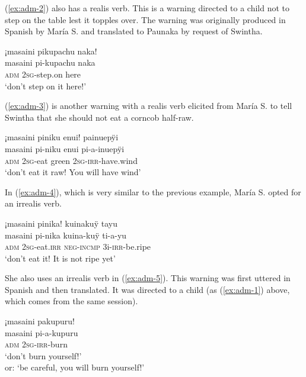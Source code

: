 (\ref{ex:adm-2}) also has a realis verb. This is a warning directed to a child not to step on the table lest it topples over. The warning was originally produced in Spanish by María S. and translated to Paunaka by request of Swintha.

\ea\label{ex:adm-1}
\begingl 
\glpreamble ¡masaini pikupachu naka!\\
\gla masaini pi-kupachu naka\\ 
\glb \textsc{adm} 2\textsc{sg}-step.on here\\ 
\glft ‘don’t step on it here!’\\ 
\endgl
\trailingcitation{[mrx-e150219s.150]}
\xe

(\ref{ex:adm-3}) is another warning with a realis verb elicited from María S. to tell Swintha that she should not eat a corncob half-raw.

\ea\label{ex:adm-3}
\begingl
\glpreamble ¡masaini piniku enui! painuepÿi\\
\gla masaini pi-niku enui pi-a-inuepÿi\\
\glb \textsc{adm} 2\textsc{sg}-eat green 2\textsc{sg}-\textsc{irr}-have.wind\\
\glft ‘don’t eat it raw! You will have wind’
\endgl
\trailingcitation{[rxx-e150220s-1.25]}
\xe

In (\ref{ex:adm-4}), which is very similar to the previous example, María S. opted for an irrealis verb.

\ea\label{ex:adm-4}
\begingl
\glpreamble ¡masaini pinika! kuinakuÿ tayu\\
\gla masaini pi-nika kuina-kuÿ ti-a-yu\\
\glb \textsc{adm} 2\textsc{sg}-eat.\textsc{irr} \textsc{neg}-\textsc{incmp} 3i-\textsc{irr}-be.ripe\\
\glft ‘don’t eat it! It is not ripe yet’
\endgl
\trailingcitation{[rxx-e181022le]}
\xe

She also uses an irrealis verb in (\ref{ex:adm-5}). This warning was first uttered in Spanish and then translated. It was directed to a child (as (\ref{ex:adm-1}) above, which comes from the same session).

\ea\label{ex:adm-5}
\begingl
\glpreamble ¡masaini pakupuru!\\
\gla masaini pi-a-kupuru\\
\glb \textsc{adm} 2\textsc{sg}-\textsc{irr}-burn\\
\glft ‘don’t burn yourself!’\\or: ‘be careful, you will burn yourself!’
\endgl
\trailingcitation{[mrx-e150219s.147]}
\xe

